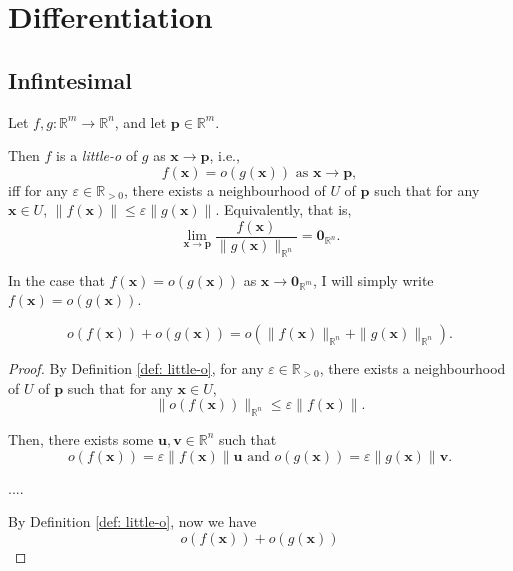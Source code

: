 
\chapter{Differentiation}


\section{Infintesimal}


\begin{definition}
	\label{def: little-o}
	Let $f, g: \mathbb R^m \to \mathbb R^n$, and let $\mathbf p \in \mathbb R^m$.
	
	Then $f$ is a \textit{little-o} of $g$ as $\mathbf x \to \mathbf p$, i.e.,
	$$
	f(\mathbf x) = o(g(\mathbf x)) \text{ as } \mathbf x \to \mathbf p,
	$$
	iff for any $\varepsilon \in \mathbb R_{> 0}$, there exists a neighbourhood of $U$ of $\mathbf p$ such that for any $\mathbf x \in U$, $\| f(\mathbf x) \| \le \varepsilon \| g(\mathbf x) \|$. Equivalently, that is,
	$$
	\lim_{\mathbf x \to \mathbf p} \frac{f(\mathbf x)}{\| g(\mathbf x) \|_{\mathbb R^n}} = \mathbf 0_{\mathbb R^n}.
	$$
\end{definition}


\begin{note}
	In the case that $f(\mathbf x) = o(g(\mathbf x))$ as $\mathbf x \to \mathbf 0_{\mathbb R^m}$, I will simply write $f(\mathbf x) = o(g(\mathbf x))$.
\end{note}


\begin{lemma}
	$$
	o(f(\mathbf x)) + o(g(\mathbf x)) = o(\| f(\mathbf x) \|_{\mathbb R^n} + \| g(\mathbf x) \|_{\mathbb R^n}).
	$$
	
	\begin{proof}
		By Definition \ref{def: little-o}, for any $\varepsilon \in \mathbb R_{> 0}$, there exists a neighbourhood of $U$ of $\mathbf p$ such that for any $\mathbf x \in U$,
		$$
		\| o(f(\mathbf x)) \|_{\mathbb R^n} \le \varepsilon \| f(\mathbf x) \|.
		$$
		
		Then, there exists some $\mathbf u, \mathbf v \in \mathbb R^n$ such that
		$$
		o(f(\mathbf x)) = \varepsilon\| f(\mathbf x) \| \mathbf u \text{ and } o(g(\mathbf x)) = \varepsilon\| g(\mathbf x) \| \mathbf v.
		$$
		

		....
		
		By Definition \ref{def: little-o}, now we have
		$$
		o(f(\mathbf x)) + o(g(\mathbf x))
		$$
	\end{proof}
\end{lemma}


